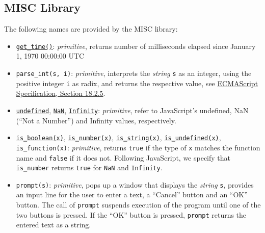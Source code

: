\subsection*{MISC Library}


The following
names are provided by the MISC library:
\begin{itemize}
\item \href{https://source-academy.github.io/sicp/chapters/1.2.6.html\#ex_1.22}{\lstinline{get_time()}}: \textit{primitive}, returns number of milliseconds elapsed since January 1, 1970 00:00:00 UTC
\item \verb#parse_int#\texttt{(s, i)}: \textit{primitive}, 
interprets the \emph{string} \texttt{s} as an integer, using the positive integer \texttt{i} as radix, and returns the respective value,
see \href{https://www.ecma-international.org/ecma-262/9.0/index.html\#sec-parseint-string-radix}{\color{DarkBlue}ECMAScript Specification, Section 18.2.5}.
\item \href{https://source-academy.github.io/sicp/chapters/2.4.3.html\#p6}{\texttt{undefined}},
  \texttt{\href{https://www.ecma-international.org/ecma-262/9.0/index.html\#sec-value-properties-of-the-global-object-nan}{\color{DarkBlue}NaN}}, \texttt{\href{https://www.ecma-international.org/ecma-262/9.0/index.html\#sec-value-properties-of-the-global-object-infinity}{\color{DarkBlue}Infinity}}: \textit{primitive}, refer to JavaScript's undefined,
NaN (``Not a Number'') and Infinity values, respectively.
\item \href{https://source-academy.github.io/sicp/chapters/4.1.2.html\#p2}{\lstinline{is_boolean(x)}}, \href{https://source-academy.github.io/sicp/chapters/2.3.2.html\#p5}{\lstinline{is_number(x)}},
  \href{https://source-academy.github.io/sicp/chapters/2.3.2.html\#p7}{\lstinline{is_string(x)}}, \href{https://source-academy.github.io/sicp/chapters/4.1.2.html\#p2}{\lstinline{is_undefined(x)}}, \verb#is_function#\texttt{(x)}: \textit{primitive}, returns \texttt{true} if the type of \texttt{x} matches the function name and \texttt{false} if it does not. Following
        JavaScript, we specify that \verb#is_number# returns \texttt{true} for \texttt{NaN} and \texttt{Infinity}.
\item \texttt{prompt(s)}: \textit{primitive}, pops up a window that displays the \emph{string} \texttt{s}, provides
an input line for the user to enter a text, a ``Cancel'' button and an ``OK'' button. The call of \texttt{prompt}
suspends execution of the program until one of the two buttons is pressed. If 
the ``OK'' button is pressed, \texttt{prompt} returns the entered text as a string.

\end{itemize}
